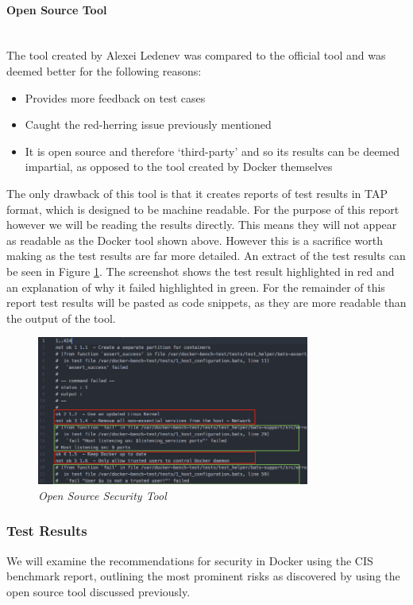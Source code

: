 \documentclass{article}
\begin{document}
\paragraph{Open Source Tool}\mbox{}\\
The tool created by Alexei Ledenev was compared to the official tool and was deemed better for the following reasons:

\begin{itemize}
  \item Provides more feedback on test cases
  \item Caught the red-herring issue previously mentioned
  \item It is open source and therefore `third-party' and so its results can be deemed impartial, as opposed to the tool created by Docker themselves
\end{itemize}

The only drawback of this tool is that it creates reports of test results in TAP format, which is designed to be machine readable. For the purpose of this report however we will be reading the results directly. This means they will not appear as readable as the Docker tool shown above. However this is a sacrifice worth making as the test results are far more detailed. An extract of the test results can be seen in Figure \ref{fig:sec_tool}. The screenshot shows the test result highlighted in red and an explanation of why it failed highlighted in green. For the remainder of this report test results will be pasted as code snippets, as they are more readable than the output of the tool.

\begin{figure}[!h]
\centering
\includegraphics*[width=0.8\textwidth]{components/images/open-source-results}
\caption{\em Open Source Security Tool}
\label{fig:sec_tool}
\end{figure}

\newpage
\subsubsection{Test Results}
\label{subs:results}
We will examine the recommendations for security in Docker using the CIS benchmark report, outlining the most prominent risks as discovered by using the open source tool discussed previously. 
\end{document}
